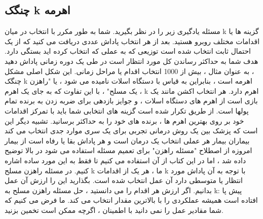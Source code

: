 \subsection{چنگک k اهرمه}

مسئله یادگیری زیر را در نظر بگیرید. شما به طور مکرر با انتخاب در میان k گزینه ها یا اقدامات مختلف روبرو هستید. بعد از هر انتخاب پاداش عددی دریافت می کنید که از یک احتمال ثابت انتخاب شده است
توزیعی که به عملی که انتخاب کرده اید بستگی دارد. هدف شما به حداکثر رساندن کل مورد انتظار است
در طی یک دوره زمانی پاداش دهید ، به عنوان مثال ، بیش از 1000 انتخاب اقدام یا مراحل زمانی.
این شکل اصلی مشکل چنگک k اهرمه است ، بنابراین به قیاس با دستگاه اسلات نامیده می شود ، یا
"راهزن یک مسلح" ، با این تفاوت که به جای یک اهرم ، k اهرم دارد. هر انتخاب اکشن مانند یک بازی است
از اهرم های دستگاه اسلات ، و جوایز بازدهی برای ضربه زدن به برنده تمام پولها است. از طریق تکرار شده است
گزینه های انتخابی شما باید با تمرکز اقدامات خود بر روی بهترین اهرم ها ، برنده های خود را به حداکثر برسانید.
تشبیه دیگر این است که پزشک بین یک روش درمانی تجربی برای یک سری موارد جدی انتخاب می کند
بیماران بیمار هر عملی انتخاب یک درمان است و هر پاداش بقا یا رفاه است
از بیمار امروزه از اصطلاح "مسئله راهزن" برای تعمیم مسئله استفاده می شود
در بالا توضیح داده شد ، اما در این کتاب از آن استفاده می کنیم تا فقط به این مورد ساده اشاره کنیم.
در مسئله راهزن مسلح k ما ، هر یک از اقدامات k با توجه به آن پاداش مورد انتظار یا متوسطی دارد
آن عمل انتخاب شده است. بگذارید این را ارزش آن عمل بدانیم.
اگر ارزش هر اقدام را می دانستید ، حل مسئله راهزن مسلح به k: پیش پا افتاده است
همیشه عملکردی را با بالاترین مقدار انتخاب می کند. ما فرض می کنیم که شما مقادیر عمل را نمی دانید
با اطمینان ، اگرچه ممکن است تخمین بزنید.

